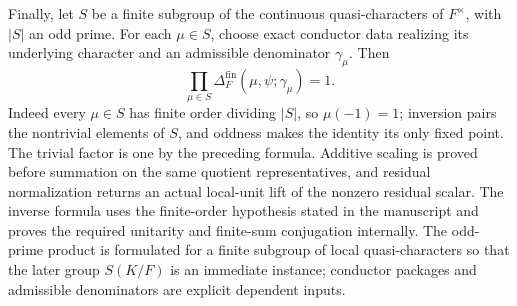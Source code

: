 \begin{theorem}
Finally, let $S$ be a finite subgroup of the continuous quasi-characters of
$F^\times$, with $|S|$ an odd prime.  For each $\mu\in S$, choose exact
conductor data realizing its underlying character and an admissible
denominator $\gamma_\mu$.  Then
\[
 \prod_{\mu\in S}
 \Delta_F^{\mathrm{fin}}(\mu,\psi;\gamma_\mu)=1.
\]
Indeed every $\mu\in S$ has finite order dividing $|S|$, so $\mu(-1)=1$;
inversion pairs the nontrivial elements of $S$, and oddness makes the
identity its only fixed point.  The trivial factor is one by the preceding
formula.
\leanok
{}
\FormalizationContract Additive scaling is proved before summation on the
same quotient representatives, and residual normalization returns an actual
local-unit lift of the nonzero residual scalar.  The inverse formula uses the
finite-order hypothesis stated in the manuscript and proves the required
unitarity and finite-sum conjugation internally.  The odd-prime product is
formulated for a finite subgroup of local quasi-characters so that the later
group $S(K/F)$ is an immediate instance; conductor packages and admissible
denominators are explicit dependent inputs.
\end{theorem}
